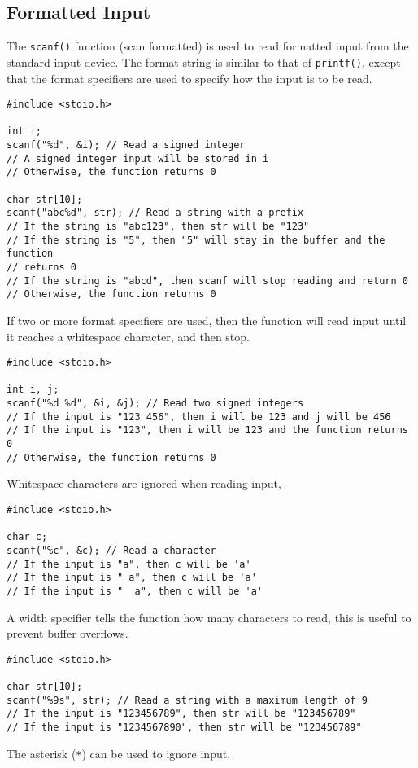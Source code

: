 \documentclass{report}
\begin{document}
\subsection{Formatted Input}
The \texttt{scanf()} function (scan formatted) is used to read
formatted input from the standard input device. The format string is
similar to that of \texttt{printf()}, except that the format
specifiers are used to specify how the input is to be read.
\begin{verbatim}
#include <stdio.h>

int i;
scanf("%d", &i); // Read a signed integer
// A signed integer input will be stored in i
// Otherwise, the function returns 0

char str[10];
scanf("abc%d", str); // Read a string with a prefix
// If the string is "abc123", then str will be "123"
// If the string is "5", then "5" will stay in the buffer and the function
// returns 0
// If the string is "abcd", then scanf will stop reading and return 0
// Otherwise, the function returns 0
\end{verbatim}
If two or more format specifiers are used, then the function will read
input until it reaches a whitespace character, and then stop.
\begin{verbatim}
#include <stdio.h>

int i, j;
scanf("%d %d", &i, &j); // Read two signed integers
// If the input is "123 456", then i will be 123 and j will be 456
// If the input is "123", then i will be 123 and the function returns 0
// Otherwise, the function returns 0
\end{verbatim}
Whitespace characters are ignored when reading input,
\begin{verbatim}
#include <stdio.h>

char c;
scanf("%c", &c); // Read a character
// If the input is "a", then c will be 'a'
// If the input is " a", then c will be 'a'
// If the input is "  a", then c will be 'a'
\end{verbatim}
A width specifier tells the function how many characters to read, this
is useful to prevent buffer overflows.
\begin{verbatim}
#include <stdio.h>

char str[10];
scanf("%9s", str); // Read a string with a maximum length of 9
// If the input is "123456789", then str will be "123456789"
// If the input is "1234567890", then str will be "123456789"
\end{verbatim}
The asterisk (\texttt{*}) can be used to ignore input.
\end{document}
